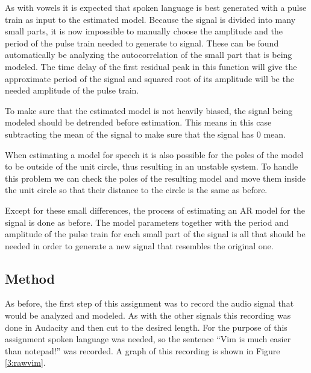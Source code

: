 \documentclass{IEEEtran}
\begin{document}
As with vowels it is expected that spoken language is best generated
with a pulse train as input to the estimated model. Because the signal
is divided into many small parts, it is now impossible to manually choose
the amplitude and the period of the pulse train needed to generate to
signal. These can be found automatically be analyzing the autocorrelation
of the small part that is being modeled. The time delay of the first
residual peak in this function will give the approximate period of the
signal and squared root of its amplitude will be the needed amplitude of
the pulse train.

To make sure that the estimated model is not heavily biased, the signal
being modeled should be detrended before estimation. This means in this
case subtracting the mean of the signal to make sure that the
signal has $0$ mean.

When estimating a model for speech it is also possible for the poles
of the model to be outside of the unit circle, thus resulting in an
unstable system. To handle this problem we can check the poles of the
resulting model and move them inside the unit circle so that their
distance to the circle is the same as before.

Except for these small differences, the process of estimating an AR
model for the signal is done as before. The model parameters together
with the period and amplitude of the pulse train for each small part
of the signal is all that should be needed in order to generate a new
signal that resembles the original one.

\subsection{Method}
As before, the first step of this assignment was to record the audio
signal that would be analyzed and modeled. As with the other signals
this recording was done in Audacity \cite{audacity} and then cut to
the desired length. For the purpose of this assignment spoken language
was needed, so the sentence ``Vim is much easier than notepad!'' was
recorded. A graph of this recording is shown in Figure \ref{3:rawvim}.
\end{document}
